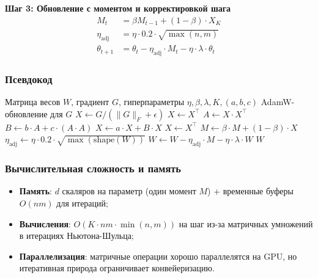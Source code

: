 \documentclass[a4paper,12pt]{article}
\begin{document}
\textbf{Шаг 3: Обновление с моментом и корректировкой шага}
\begin{align}
    M_t &= \beta M_{t-1} + (1 - \beta) \cdot X_K \\
    \eta_{\text{adj}} &= \eta \cdot 0.2 \cdot \sqrt{\max(n, m)} \\
    \theta_{t+1} &= \theta_t - \eta_{\text{adj}} \cdot M_t - \eta \cdot \lambda \cdot \theta_t
\end{align}

\subsubsection{Псевдокод}

\begin{algorithm}[H]
\caption{Muon: обновление одного весового матричного параметра}
\label{alg:muon}
\begin{algorithmic}[1]
\Require Матрица весов $W$, градиент $G$, гиперпараметры $\eta, \beta, \lambda, K, (a,b,c)$
    \State \Return AdamW-обновление для $G$ 
\EndIf
\State {}
\State $X \gets G / (\|G\|_F + \epsilon)$
    \State $X \gets X^\top$
\EndIf
\State {}
    \State $A \gets X \cdot X^\top$
    \State $B \gets b \cdot A + c \cdot (A \cdot A)$
    \State $X \gets a \cdot X + B \cdot X$
\EndFor
{}
    \State $X \gets X^\top$
\EndIf
\State {}
\State $M \gets \beta \cdot M + (1 - \beta) \cdot X$
\State $\eta_{\text{adj}} \gets \eta \cdot 0.2 \cdot \sqrt{\max(\text{shape}(W))}$
\State $W \gets W - \eta_{\text{adj}} \cdot M - \eta \cdot \lambda \cdot W$
\State \Return $W$
\end{algorithmic}
\end{algorithm}

\subsubsection{Вычислительная сложность и память}

\begin{itemize}
    \item \textbf{Память}: $d$ скаляров на параметр (один момент $M$) + временные буферы $O(nm)$ для итераций;
    \item \textbf{Вычисления}: $O(K \cdot nm \cdot \min(n,m))$ на шаг из-за матричных умножений в итерациях Ньютона-Шульца;
    \item \textbf{Параллелизация}: матричные операции хорошо параллелятся на GPU, но итеративная природа ограничивает конвейеризацию.
\end{itemize}
\end{document}

